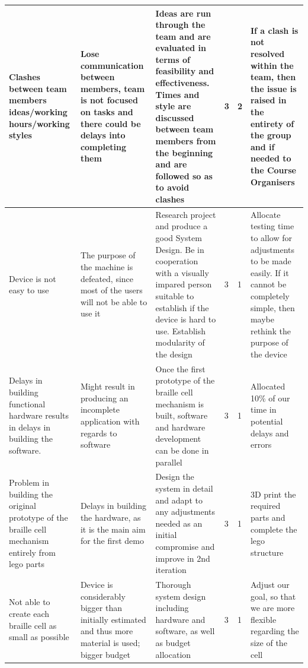\documentclass{article}
\begin{document}
\begin{table}[h]
\begin{center}
\begin{small}
\begin{tabular}{|p{3cm}|p{3cm}|p{3cm}|p{1cm}|p{1.2cm}|p{3cm}|}
Clashes between team members ideas/working hours/working styles                                   & Lose communication between members, team is not focused on tasks and there could be delays into completing them & Ideas are run through the team and are evaluated in terms of feasibility and effectiveness. Times and style are discussed between team members from the beginning and are followed so as to avoid clashes & 3        & 2          & If a clash is not resolved within the team, then the issue is raised in the entirety of the group and if needed to the Course Organisers          \\ \hline
Device is not easy to use                                                                         & The purpose of the machine is defeated, since most of the users will not be able to use it                      & Research project and produce a good System Design. Be in cooperation with a visually impared person suitable to establish if the device is hard to use. Establish modularity of the design                & 3        & 1          & Allocate testing time to allow for adjustments to be made easily. If it cannot be completely simple, then maybe rethink the purpose of the device \\ \hline
Delays in building functional hardware results in delays in building the software.                & Might result in producing an incomplete application with regards to software                                    & Once the first prototype of the braille cell mechanism is built, software and hardware development can be done in parallel                                                                                & 3        & 1          & Allocated 10\% of our time in potential delays and errors                                                                                         \\ \hline
Problem in building the original prototype of the braille cell mechanism entirely from lego parts & Delays in building the hardware, as it is the main aim for the first demo                                       & Design the system in detail and adapt to any adjustments needed as an initial compromise and improve in 2nd iteration                                                                                     & 3        & 1          & 3D print the required parts and complete the lego structure                                                                                       \\ \hline
Not able to create each braille cell as small as possible                                         & Device is considerably bigger than initially estimated and thus more material is used; bigger budget            & Thorough system design including hardware and software, as well as budget allocation                                                                                                                      & 3        & 1          & Adjust our goal, so that we are more flexible regarding the size of the cell                                                                      \\ \hline

\end{tabular}
\end{small}
\end{center}
\end{table}
\end{document}
